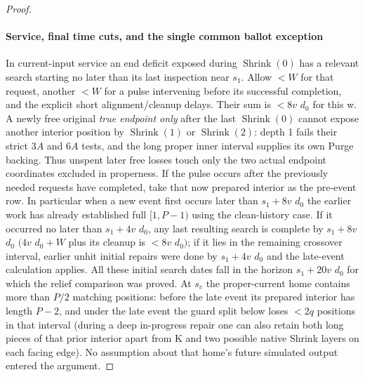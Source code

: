 \begin{proof}
\paragraph{Service, final time cuts, and the single common ballot exception}

In current-input service an end deficit exposed during \(\operatorname{Shrink}(0)\) has a relevant search starting no later than its last inspection near \(s_1\). Allow \(<W\) for that request, another \(<W\) for a pulse intervening before its successful completion, and the explicit short alignment/cleanup delays. Their sum is \(<8v\) \(d_0\) for this w. A newly free original \emph{true endpoint only} after the last \(\operatorname{Shrink}(0)\) cannot expose another interior position by \(\operatorname{Shrink}(1)\) or \(\operatorname{Shrink}(2)\): depth 1 fails their strict \(3A\) and \(6A\) tests, and the long proper inner interval supplies its own Purge backing. Thus unspent later free losses touch only the two actual endpoint coordinates excluded in properness. If the pulse occurs after the previously needed requests have completed, take that now prepared interior as the pre-event row. In particular when a new event first occurs later than \(s_1+8v\) \(d_0\) the earlier work has already established full \([1,P- 1)\) using the clean-history case. If it occurred no later than \(s_1+4v\) \(d_0\), any last resulting search is complete by \(s_1+8v\) \(d_0\) \((4v\) \(d_0+W\) plus its cleanup is \(<8v\) \(d_0)\); if it lies in the remaining crossover interval, earlier unhit initial repairs were done by \(s_1+4v\) \(d_0\) and the late-event calculation applies. All these initial search dates fall in the horizon \(s_1+20v\) \(d_0\) for which the relief comparison was proved. At \(s_c\) the proper-current home contains more than \(P/2\) matching positions: before the late event its prepared interior has length \(P- 2\), and under the late event the guard split below loses \(<2q\) positions in that interval (during a deep in-progress repair one can also retain both long pieces of that prior interior apart from K and two possible native Shrink layers on each facing edge). No assumption about that home's future simulated output entered the argument.


\end{proof}
